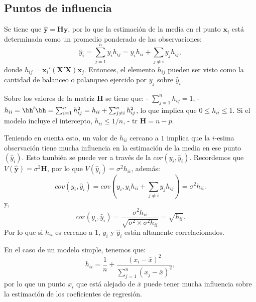 \documentclass[
]{article}
\begin{document}
\subsection{Puntos de influencia}\label{puntos-de-influencia}

Se tiene que \(\widehat{\boldsymbol y}= \boldsymbol H\boldsymbol y\), por lo que la estimación de la media en el punto \(\boldsymbol x_i\) está determinada como un promedio ponderado de las observaciones:
\[
\widehat{y}_i = \sum_{j=1}^{n}y_{i}h_{ij} = y_{i}h_{ii} + \sum_{j\neq i}y_{j}h_{ij},
\]
donde \(h_{ij} = \boldsymbol x_{i}'(\boldsymbol X'\boldsymbol X)\boldsymbol x_{j}\). Entonces, el elemento \(h_{ij}\) pueden ser visto como la cantidad de balanceo o palanqueo ejercido por \(y_j\) sobre \(\widehat{y}_i\).

Sobre los valores de la matriz \(\boldsymbol H\) se tiene que:
- \(\sum_{j=1}^{n}h_{ij} = 1\),
- \(h_{ii} = \bh'\bh = \sum_{i=1}^{n}h_{ij}^2 = h_{ii} + \sum_{j \neq i}^{n}h_{ij}^2\), lo que implica que \(0 \leq h_{ii} \leq 1\). Si el modelo incluye el intercepto, \(h_{ii} \leq 1/n\),
- tr \(\boldsymbol H= n-p\).

Teniendo en cuenta esto, un valor de \(h_{ii}\) cercano a \(1\) implica que la \(i\)-esima observación tiene mucha influencia en la estimación de la media en ese punto \((\widehat{y}_i)\). Esto también se puede ver a través de la \(cor(y_i,\widehat{y}_i)\). Recordemos que \(V(\widehat{\boldsymbol y}) = \sigma^2\boldsymbol H\), por lo que \(V(\widehat{y}_i) = \sigma^2h_{ii}\), además:
\[
cov(y_i,\widehat{y}_i) = cov\left(y_i,y_{i}h_{ii} + \sum_{j\neq i}y_{j}h_{ij}\right) = \sigma^2 h_{ii}.
\]
y,
\[
cor(y_i,\widehat{y}_i) = \frac{\sigma^2 h_{ii}}{\sqrt{\sigma^2 \times \sigma^2 h_{ii}}} = \sqrt{h_{ii}}.
\]
Por lo que si \(h_{ii}\) es cercano a \(1\), \(y_i\) y \(\widehat{y}_i\) están altamente correlacionados.

En el caso de un modelo simple, tenemos que:
\[
h_{ii}= \frac{1}{n} + \frac{(x_i-\bar{x})^2}{\sum_{j=1}^{n}(x_j-\bar{x})^2},
\]
por lo que un punto \(x_i\) que está alejado de \(\bar{x}\) puede tener mucha influencia sobre la estimación de los coeficientes de regresión.
\end{document}
